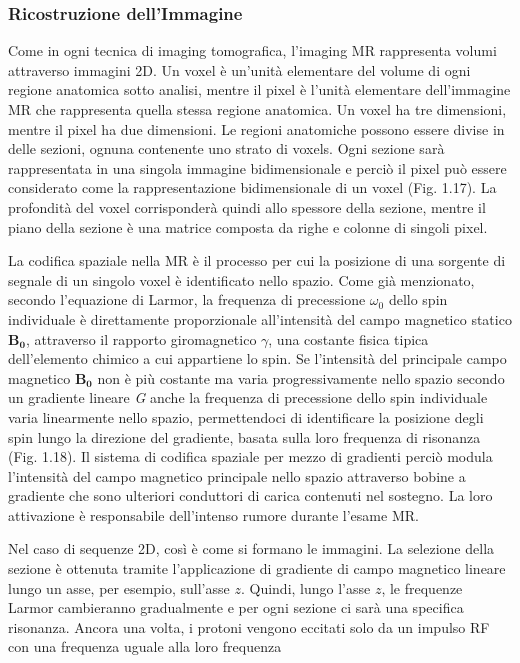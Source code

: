 \documentclass[leqno,10pt,twocolumn,a4paper]{article}
\begin{document}
	\subsubsection{Ricostruzione dell'Immagine}
	Come in ogni tecnica di imaging tomografica, l'imaging MR rappresenta volumi attraverso immagini 2D. Un voxel è un'unità elementare del volume di ogni regione anatomica sotto analisi, mentre il pixel è
	l'unità elementare dell'immagine MR che rappresenta quella stessa regione anatomica. Un voxel ha tre dimensioni, mentre il pixel ha due dimensioni. Le regioni anatomiche possono essere divise in delle 
	sezioni, ognuna contenente uno strato di voxels. Ogni sezione sarà rappresentata in una singola immagine bidimensionale e perciò il pixel può essere considerato come la rappresentazione bidimensionale
	di un voxel (Fig. 1.17). La profondità del voxel corrisponderà quindi allo spessore della sezione, mentre il piano della sezione è una matrice composta da righe e colonne di singoli pixel.
	\par La codifica spaziale nella MR è il processo per cui la posizione di una sorgente di segnale di un singolo voxel è identificato nello spazio. Come già menzionato, secondo l'equazione di Larmor, la
	frequenza di precessione $\omega_0$ dello spin individuale è direttamente proporzionale all'intensità del campo magnetico statico $\boldsymbol{B_0}$, attraverso il rapporto giromagnetico $\gamma$,
	una costante fisica tipica dell'elemento chimico a cui appartiene lo spin. Se l'intensità del principale campo magnetico $\boldsymbol{B_0}$ non è più costante ma varia progressivamente nello spazio
	secondo un gradiente lineare \textit{G} anche la frequenza di precessione dello spin individuale varia linearmente nello spazio, permettendoci di identificare la posizione degli spin lungo la direzione del
	gradiente, basata sulla loro frequenza di risonanza (Fig. 1.18). Il sistema di codifica spaziale per mezzo di gradienti perciò modula l'intensità del campo magnetico principale nello spazio attraverso 
	bobine a gradiente che sono ulteriori conduttori di carica contenuti nel sostegno. La loro attivazione è responsabile dell'intenso rumore durante l'esame MR. \par Nel caso di sequenze 2D, così è come si
	formano le immagini. La selezione della sezione è ottenuta tramite l'applicazione di gradiente di campo magnetico lineare lungo un asse, per esempio, sull'asse $z$. Quindi, lungo l'asse $z$, le frequenze
	Larmor cambieranno gradualmente e per ogni sezione ci sarà una specifica risonanza. Ancora una volta, i protoni vengono eccitati solo da un impulso RF con una frequenza uguale alla loro frequenza
\end{document}
